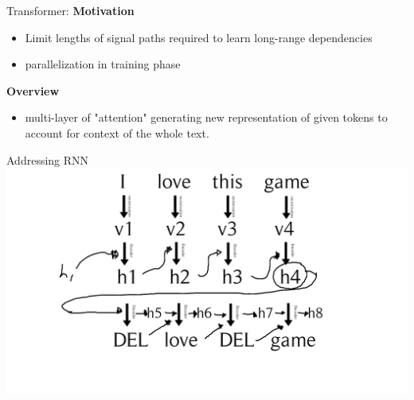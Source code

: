 \documentclass{beamer}
\begin{document}
\begin{frame}{Transformer: }
\textbf{Motivation}
\begin{itemize}
    \item Limit lengths of signal paths required to learn long-range dependencies
    \item  parallelization in training phase 
\end{itemize}
\textbf{Overview}
\begin{itemize}
    \item multi-layer of "attention" generating new representation of given tokens to account for context of the whole text.
\end{itemize}
\end{frame}

\begin{frame}{Addressing RNN}
        \includegraphics[scale=0.2]
{img/RNN_sim.jpg}
\centering
\end{frame}
\end{document}
